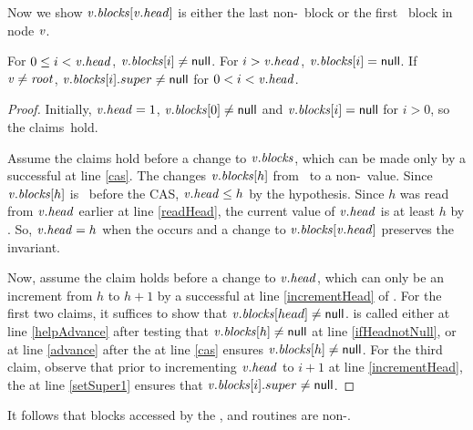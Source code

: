 Now we show $\var{v}.\fld{blocks}[\var{v}.\head]$ is either the last non-\nl\ block or the first \nl\ block in node $\var{v}$.

\begin{invariant}\label{lem::headPosition} 
For $0 \leq i < \var{v}.\head$, $\var{v}.\fld{blocks}[i]\neq\nl$.  For $i>\var{v}.\head$, $\var{v}.\fld{blocks}[i]=\nl$.
If $\var{v}\neq \var{root}$,  $\var{v}.\fld{blocks}[i].super \neq \nl$ for $0<i<\var{v}.\head$.
\end{invariant}

\begin{proof}
Initially, $\var{v}.\head=1$, $\var{v}.\fld{blocks}[0]\neq\nl$  and $\var{v}.\fld{blocks}[i]=\nl$ for  $i>0$, so the claims~hold.

Assume the claims hold before a change to $\var{v}.\fld{blocks}$, which can be made only
by a successful  at line \ref{cas}.
The  changes $\var{v}.\fld{blocks}[h]$ from \nl\ to a non-\nl\ value.
Since $\var{v}.\fld{blocks}[h]$ is \nl\ before the CAS, $\var{v}.\head \leq h$ by the hypothesis.
Since $h$ was read from $\var{v}.\head$ earlier at line \ref{readHead}, the current value of 
$\var{v}.\head$ is at least $h$ by .
So, $\var{v}.\head=h$ when the  occurs and a change to $\var{v}.\fld{blocks}[\var{v}.\head]$ preserves the invariant.

Now, assume the claim holds before a change to $\var{v}.\head$, which can only be an increment from $h$ to $h+1$
by a successful  at line \ref{incrementHead} of .
For the first two claims, it suffices to show that $\var{v}.\fld{blocks}[head] \neq \nl$.
 is called either at line \ref{helpAdvance} 
after testing that $\var{v}.\fld{blocks}[h]\neq\nl$ at line \ref{ifHeadnotNull},
or at line \ref{advance} after the  at line \ref{cas} ensures $\var{v}.\fld{blocks}[h]\neq\nl$.
For the third claim, observe that prior to incrementing $\var{v}.\head$ to $i+1$ at line \ref{incrementHead},
the  at line \ref{setSuper1} ensures that $\var{v}.\fld{blocks}[i].super\neq \nl$.
\end{proof}

It follows that blocks accessed by the ,  and  routines are non-\nl.

